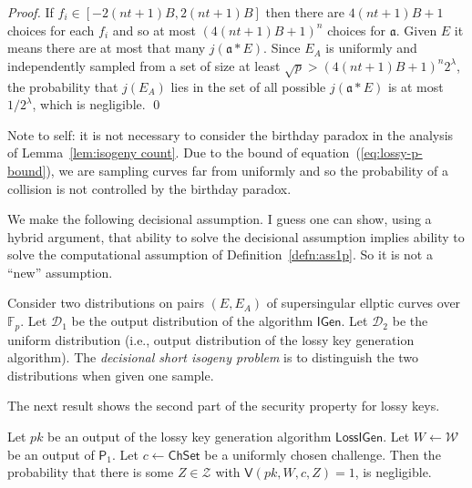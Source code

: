 \documentclass{llncs}
\newcommand{\D}{\mathcal{D}}
\newcommand{\F}{\mathbb{F}}
\renewcommand{\a}{\mathfrak{a}}
\newcommand{\IGen}{\mathsf{IGen}}
\newcommand{\PP}{\mathsf{P}}
\newcommand{\VV}{\mathsf{V}}
\newcommand{\Wset}{\mathcal{W}}
\newcommand{\Zset}{\mathcal{Z}}
\newcommand{\ChSet}{\textsf{ChSet}}
\newcommand{\LossIGen}{\mathsf{LossIGen}}
\begin{document}
\begin{proof}
If $f_i \in [-2(nt+1)B,2(nt+1)B]$ then there are $4(nt+1)B + 1$ choices for each $f_i$ and so at most $(4 (nt+1)B + 1)^{n}$ choices for $\a$.
Given $E$ it means there are at most that many $j( \a * E )$. Since $E_A$ is uniformly and independently sampled from a set of size at least $\sqrt{p} > (4 (nt+1)B + 1)^{n} 2^\lambda$, the probability that $j(E_A)$ lies in the set of all possible $j( \a * E )$ is at most $1/2^\lambda$, which is negligible. \qed
\end{proof}

Note to self: it is not necessary to consider the birthday paradox in the analysis of Lemma~\ref{lem:isogeny count}. Due to the bound of equation~(\ref{eq:lossy-p-bound}), we are sampling curves far from uniformly and so the probability of a collision is not controlled by the birthday paradox.

We make the following decisional assumption.
I guess one can show, using a hybrid argument, that ability to solve the decisional assumption implies ability to solve the computational assumption of Definition~\ref{defn:ass1p}. So it is not a ``new'' assumption.

\begin{definition}
Consider two distributions on pairs $(E, E_A)$ of supersingular ellptic curves over $\F_p$.
Let $\D_1$ be the output distribution of the algorithm $\IGen$.
Let $\D_2$ be the uniform distribution (i.e., output distribution of the lossy key generation algorithm).
The \emph{decisional short isogeny problem} is to distinguish the two distributions when given one sample.
\end{definition}

The next result shows the second part of the security property for lossy keys.

\begin{lemma}
Let $pk$ be an output of the lossy key generation algorithm $\LossIGen$.
Let $W \leftarrow \Wset$ be an output of $\PP_1$.
Let $c \leftarrow \ChSet$ be a uniformly chosen challenge.
Then the probability that there is some $Z \in \Zset$ with $\VV( pk, W, c, Z ) = 1$, is negligible.
\end{lemma}
\end{document}
